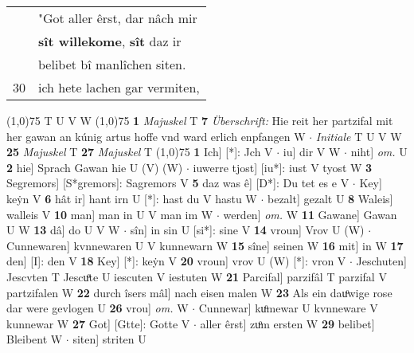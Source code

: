 \documentclass[8pt,a4paper,notitlepage]{article}
\begin{document}
\begin{table}[ht]
\begin{minipage}[t]{0.5\linewidth}
\begin{tabular}{rl}
 & "Got aller êrst, dar nâch mir\\ 
 & \textbf{sît willekome}, \textbf{sît} daz ir\\ 
 & belibet bî manlîchen siten.\\ 
30 & ich hete lachen gar vermiten,\\ 
\end{tabular}
\scriptsize
\line(1,0){75} \newline
T U V W \newline
\line(1,0){75} \newline
\textbf{1} \textit{Majuskel} T  \textbf{7} \textit{Überschrift:} Hie reit her partzifal mit her gawan an kúnig artus hoffe vnd ward erlich enpfangen W   $\cdot$ \textit{Initiale} T U V W  \textbf{25} \textit{Majuskel} T  \textbf{27} \textit{Majuskel} T  \newline
\line(1,0){75} \newline
\textbf{1} Ich] [*]: Jch V  $\cdot$ iu] dir V W  $\cdot$ niht] \textit{om.} U \textbf{2} hie] Sprach Gawan hie U (V) (W)  $\cdot$ iuwerre tjost] [iu*]: iust V tyost W \textbf{3} Segremors] [S*gremors]: Sagremors V \textbf{5} daz was ê] [D*]: Du tet es e V  $\cdot$ Key] keẏn V \textbf{6} hât ir] hant irn U [*]: hast du V hastu W  $\cdot$ bezalt] gezalt U \textbf{8} Waleis] walleis V \textbf{10} man] man in U V man im W  $\cdot$ werden] \textit{om.} W \textbf{11} Gawane] Gawan U W \textbf{13} dâ] do U V W  $\cdot$ sîn] in sin U [si*]: sine V \textbf{14} vroun] Vrov U (W)  $\cdot$ Cunnewaren] kvnnewaren U V kunnewarn W \textbf{15} sîne] seinen W \textbf{16} mit] in W \textbf{17} den] [I]: den V \textbf{18} Key] [*]: keẏn V \textbf{20} vroun] vrov U (W) [*]: vron  V  $\cdot$ Jeschuten] Jescvten T Jescuͦte U iescuten V iestuten W \textbf{21} Parcifal] parzifâl T parzifal V partzifalen W \textbf{22} durch îsers mâl] nach eisen malen W \textbf{23} Als ein dauͦwige rose dar were gevlogen U \textbf{26} vrou] \textit{om.} W  $\cdot$ Cunnewar] kuͦmewar U kvnneware V kunnewar W \textbf{27} Got] [Gtte]: Gotte V  $\cdot$ aller êrst] zuͦm ersten W \textbf{29} belibet] Bleibent W  $\cdot$ siten] striten U \newline
\end{minipage}
\end{table}
\end{document}
